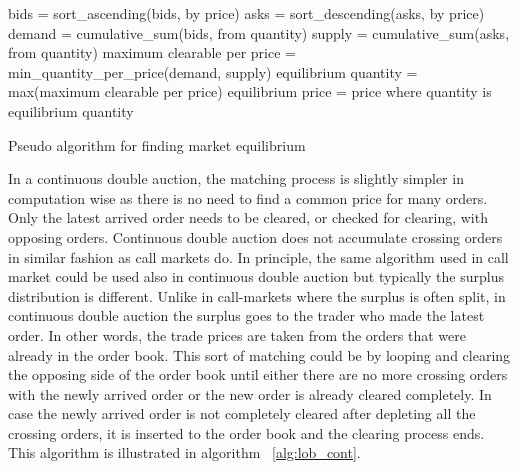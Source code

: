 \begin{algorithm}[H]
    \SetAlgoLined
    \DontPrintSemicolon
    
    bids = sort\_ascending(bids, by price)\;
    asks = sort\_descending(asks, by price)\;
    \;
    demand = cumulative\_sum(bids, from quantity)\;
    supply = cumulative\_sum(asks, from quantity)\;
    \;
    maximum clearable per price = min\_quantity\_per\_price(demand, supply)\;
    \;
    equilibrium quantity = max(maximum clearable per price)\;
    equilibrium price = price where quantity is equilibrium quantity\;
    \caption{Pseudo algorithm for finding market equilibrium}
    \label{alg:lob_equil}
\end{algorithm}


In a continuous double auction, the matching process is slightly simpler in computation
wise as there is no need to find a common price for many orders. Only the latest arrived
order needs to be cleared, or checked for clearing, with opposing orders. Continuous
double auction does not accumulate crossing orders in similar fashion as call markets do. 
In principle, the same algorithm used in call market could be used also in continuous double auction 
but typically the surplus distribution is different. Unlike in call-markets where the surplus is often
split, in continuous double auction the surplus goes to the trader who made the latest order.
In other words, the trade prices are taken from the orders that were already in the order book.
This sort of matching could be by looping and clearing the opposing side of the order book until either
there are no more crossing orders with the newly arrived order or the new order is already cleared
completely. In case the newly arrived order is not completely cleared after depleting all the crossing
orders, it is inserted to the order book and the clearing process ends. This algorithm is illustrated in
algorithm ~\ref{alg:lob_cont}. 

